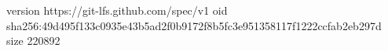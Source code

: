 version https://git-lfs.github.com/spec/v1
oid sha256:49d495f133c0935e43b5ad2f0b9172f8b5fc3e951358117f1222ccfab2eb297d
size 220892
